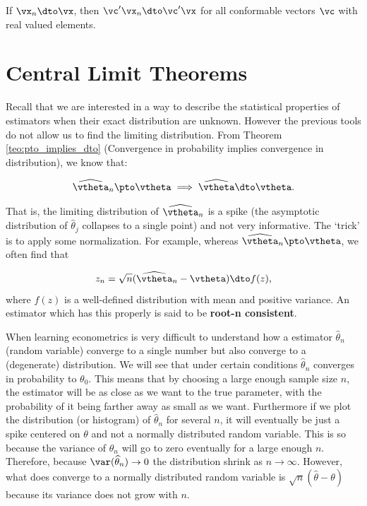 \documentclass[english,12pt]{book}\usepackage[]{graphicx}\usepackage[]{xcolor}
\begin{document}
\begin{theorem}
If $\vx_n \dto \vx$, then $\vc'\vx_n \dto \vc'\vx$ for all conformable vectors $\vc$ with real valued elements.
\end{theorem}

\section{Central Limit Theorems}

Recall that we are interested in a way to describe the statistical properties of estimators when their exact distribution are unknown. However the previous tools do not allow us to find the limiting distribution. From Theorem \ref{teo:pto_implies_dto} (Convergence in probability implies convergence in distribution), we know that:

\begin{equation*}
  \widehat{\vtheta}_n\pto \vtheta \implies \widehat{\vtheta}\dto \vtheta.
\end{equation*}

That is, the limiting distribution of $\widehat{\vtheta}_n$ is a spike (the asymptotic distribution of $\widehat{\theta}_j$ collapses to a single point) and not very informative. The `trick' is to apply some normalization. For example, whereas $\widehat{\vtheta}_n\pto \vtheta$, we often find that

\begin{equation}
z_n = \sqrt{n}(\widehat{\vtheta}_n - \vtheta) \dto f(z),
\end{equation}
%
where $f(z)$ is a well-defined distribution with mean and positive variance. An estimator which has this properly is said to be \textbf{root-n consistent}.

\begin{mynote}
When learning econometrics is very difficult to understand how a estimator $\widehat{\theta}_n$ (random variable) converge to a single number but also converge to a (degenerate) distribution. We will see that under certain conditions $\widehat{\theta}_n$ converges in probability to $\theta_0$. This means that by choosing a large enough sample size $n$, the estimator will be as close as we want to the true parameter, with the probability of it being farther away as small as we want. Furthermore if we plot the distribution (or histogram) of $\widehat{\theta}_n$ for several $n$, it will eventually be just a spike centered on $\theta$ and not a normally distributed random variable. This is so because the variance of $\widehat{\theta}_n$ will go to zero eventually for a large enough $n$. Therefore, because $\var(\widehat{\theta}_n)\to 0$ the distribution shrink as $n\to \infty$. However, what does converge to a normally distributed random variable is $\sqrt{n}(\widehat{\theta}- \theta)$ because its variance does not grow with $n$. 
\end{mynote}
\end{document}
